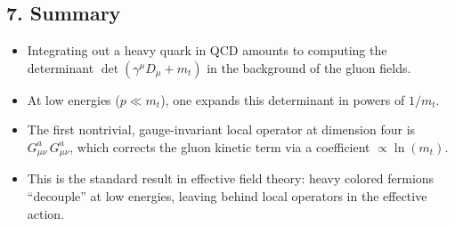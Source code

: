 \documentclass[11pt]{article}
\begin{document}
\subsection*{7. Summary}

\begin{itemize}
\item Integrating out a heavy quark in QCD amounts to computing the determinant $\det(\gamma^\mu D_\mu + m_t)$ in the background of the gluon fields.
\item At low energies ($p \ll m_t$), one expands this determinant in powers of $1/m_t$.
\item The first nontrivial, gauge-invariant local operator at dimension four is $G_{\mu\nu}^a\,G_{\mu\nu}^a$, which corrects the gluon kinetic term via a coefficient $\propto \ln(m_t)$.
\item This is the standard result in effective field theory: heavy colored fermions ``decouple'' at low energies, leaving behind local operators in the effective action.
\end{itemize}
\end{document}
